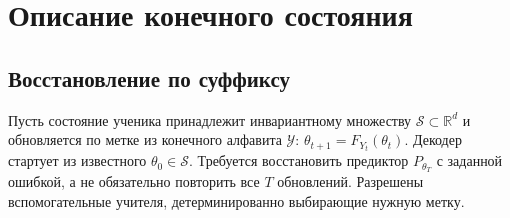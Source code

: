 \section{Описание конечного состояния}
\label{sec:endpoint}

\subsection{Восстановление по суффиксу}

Пусть состояние ученика принадлежит инвариантному множеству
$\mathcal S\subset\mathbb R^d$ и обновляется по метке из конечного алфавита
$\mathcal Y$:
$\theta_{t+1}=F_{Y_t}(\theta_t)$.
Декодер стартует из известного $\theta_0\in\mathcal S$. Требуется восстановить
предиктор $P_{\theta_T}$ с заданной ошибкой, а не обязательно повторить
все $T$ обновлений. Разрешены вспомогательные учителя, детерминированно
выбирающие нужную метку.

